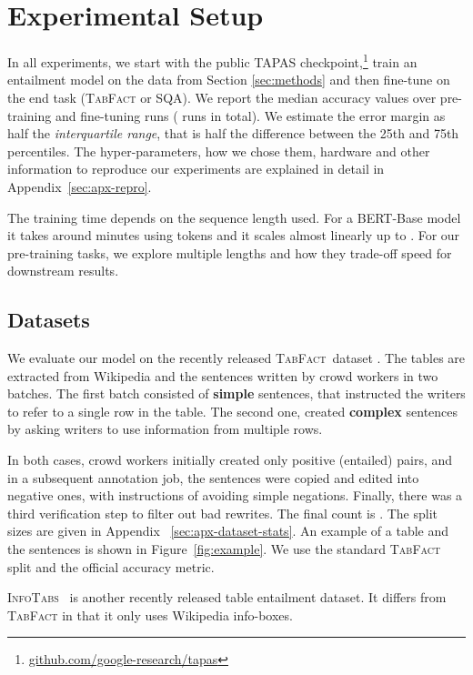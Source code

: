 \documentclass[11pt,a4paper]{article}
\newcommand{\infotabstext}[1]{#1}
\newcommand{\infotabstext}[1]{}
\newcommand{\sqa}{\textsc{SQA}\xspace}
\newcommand{\tabfact}{\textsc{TabFact}\xspace}
\newcommand{\infotabs}{\textsc{InfoTabs}\xspace}
\newcommand{\tapas}{\textsc{TAPAS}\xspace}
\newcommand{\bert}{\textsc{BERT}\xspace}
\theoremstyle{definition}
\begin{document}
 \section{Experimental Setup}
\label{sec:experiments}

In all experiments, we start with the public \tapas{} checkpoint,\footnote{\href{https://github.com/google-research/tapas}{github.com/google-research/tapas}} train an entailment model on the data from Section \ref{sec:methods} and then fine-tune on the end task (\tabfact or \sqa). We report the median accuracy values over  pre-training and  fine-tuning runs ( runs in total). 
We estimate the error margin as half the \emph{interquartile range}, that is half the difference between the 25th and 75th percentiles.
The hyper-parameters, how we chose them, hardware and other information to reproduce our experiments are explained in detail in Appendix~\ref{sec:apx-repro}.

The training time depends on the sequence length used. For a \bert{}-Base model it takes around  minutes using  tokens and it scales almost linearly up to . For our pre-training tasks, we explore multiple lengths and how they trade-off speed for downstream results.

\subsection{Datasets}

We evaluate our model on the recently released \tabfact~dataset \cite{2019TabFactA}. 
The tables are extracted from Wikipedia and the sentences written by crowd workers in two batches. The first batch consisted of \textbf{simple} sentences, that instructed the writers to refer to a single row in the table. The second one, created \textbf{complex} sentences by asking writers to use information from multiple rows.

In both cases, crowd workers initially created only positive (entailed) pairs, and in a subsequent annotation job, the sentences were copied and edited into negative ones, with instructions of avoiding simple negations. Finally, there was a third verification step to filter out bad rewrites.
The final count is . The split sizes are given in Appendix ~\ref{sec:apx-dataset-stats}.
An example of a table and the sentences is shown in Figure~\ref{fig:example}. 
We use the standard \tabfact split and the official accuracy metric.

\infotabstext{
\infotabs{}~\cite{gupta2020infotabs} is another recently released table entailment dataset. It differs from \tabfact in that it only uses Wikipedia info-boxes. 
}
\end{document}
